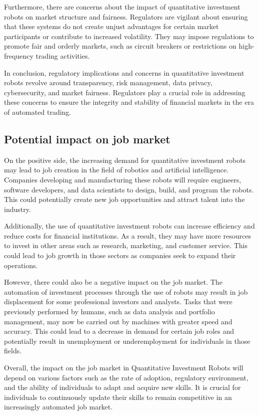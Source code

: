 \documentclass[UTF8]{ctexart}
\begin{document}
Furthermore, there are concerns about the impact of quantitative investment robots on market structure and fairness. Regulators are vigilant about ensuring that these systems do not create unjust advantages for certain market participants or contribute to increased volatility. They may impose regulations to promote fair and orderly markets, such as circuit breakers or restrictions on high-frequency trading activities.

In conclusion, regulatory implications and concerns in quantitative investment robots revolve around transparency, risk management, data privacy, cybersecurity, and market fairness. Regulators play a crucial role in addressing these concerns to ensure the integrity and stability of financial markets in the era of automated trading.

\subsection{Potential impact on job market}
On the positive side, the increasing demand for quantitative investment robots may lead to job creation in the field of robotics and artificial intelligence. Companies developing and manufacturing these robots will require engineers, software developers, and data scientists to design, build, and program the robots. This could potentially create new job opportunities and attract talent into the industry.

Additionally, the use of quantitative investment robots can increase efficiency and reduce costs for financial institutions. As a result, they may have more resources to invest in other areas such as research, marketing, and customer service. This could lead to job growth in those sectors as companies seek to expand their operations.

However, there could also be a negative impact on the job market. The automation of investment processes through the use of robots may result in job displacement for some professional investors and analysts. Tasks that were previously performed by humans, such as data analysis and portfolio management, may now be carried out by machines with greater speed and accuracy. This could lead to a decrease in demand for certain job roles and potentially result in unemployment or underemployment for individuals in those fields.

Overall, the impact on the job market in Quantitative Investment Robots will depend on various factors such as the rate of adoption, regulatory environment, and the ability of individuals to adapt and acquire new skills. It is crucial for individuals to continuously update their skills to remain competitive in an increasingly automated job market.
\end{document}
